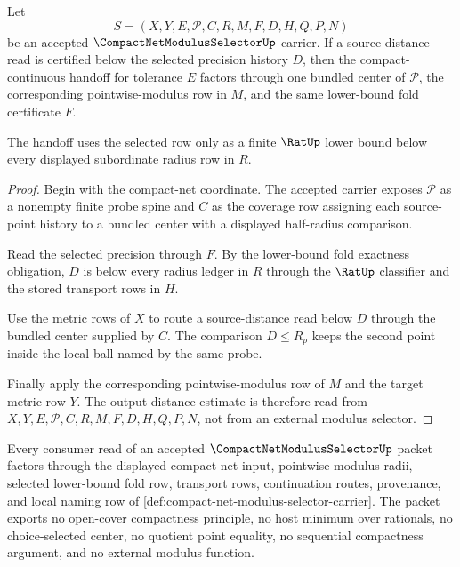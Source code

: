 \begin{theorem}
\label{thm:compact-net-modulus-selector-fold-soundness}
Let
$$
S=(X,Y,E,\mathcal{P},C,R,M,F,D,H,Q,P,N)
$$
be an accepted $\CompactNetModulusSelectorUp$ carrier. If a source-distance read is certified below the selected precision history $D$, then the compact-continuous handoff for tolerance $E$ factors through one bundled center of $\mathcal{P}$, the corresponding pointwise-modulus row in $M$, and the same lower-bound fold certificate $F$.

The handoff uses the selected row only as a finite $\RatUp$ lower bound below every displayed subordinate radius row in $R$.
\end{theorem}

\begin{proof}
Begin with the compact-net coordinate. The accepted carrier exposes $\mathcal{P}$ as a nonempty finite probe spine and $C$ as the coverage row assigning each source-point history to a bundled center with a displayed half-radius comparison.

Read the selected precision through $F$. By the lower-bound fold exactness obligation, $D$ is below every radius ledger in $R$ through the $\RatUp$ classifier and the stored transport rows in $H$.

Use the metric rows of $X$ to route a source-distance read below $D$ through the bundled center supplied by $C$. The comparison $D \le R_p$ keeps the second point inside the local ball named by the same probe.

Finally apply the corresponding pointwise-modulus row of $M$ and the target metric row $Y$. The output distance estimate is therefore read from $X,Y,E,\mathcal{P},C,R,M,F,D,H,Q,P,N$, not from an external modulus selector.
\end{proof}

\begin{theorem}
\label{thm:compact-net-modulus-selector-nonescape}
Every consumer read of an accepted $\CompactNetModulusSelectorUp$ packet factors through the displayed compact-net input, pointwise-modulus radii, selected lower-bound fold row, transport rows, continuation routes, provenance, and local naming row of \autoref{def:compact-net-modulus-selector-carrier}. The packet exports no open-cover compactness principle, no host minimum over rationals, no choice-selected center, no quotient point equality, no sequential compactness argument, and no external modulus function.
\end{theorem}

